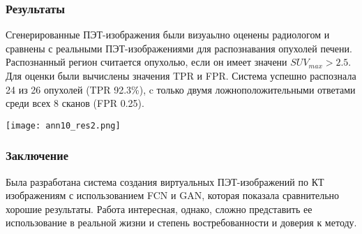 \subsubsection*{Результаты}
Сгенерированные ПЭТ-изображения были визуаьлно оценены радиологом и сравнены с реальными ПЭТ-изображениями
для распознавания опухолей печени. Распознанный регион считается опухолью, если он имеет 
значени \(SUV_{max}>2.5\).  Для оценки были вычислены значения TPR и FPR.
Система успешно распознала 24 из 26 опухолей (TPR 92.3\%), c только 
двумя ложноположительными ответами среди всех 8 сканов (FPR 0.25).
\\
\begin{minipage}{1.0\linewidth}
    \begin{center}
        \texttt{[image: ann10\_res2.png]} \\
    \end{center}
    
\end{minipage}
\subsubsection*{Заключение}
Была разработана система создания виртуальных ПЭТ-изображений 
по КТ изображениям с использованием FCN и GAN, которая показала 
сравнительно хорошие результаты. Работа интересная, однако, сложно представить 
ее использование в реальной жизни и степень востребованности и доверия к методу.